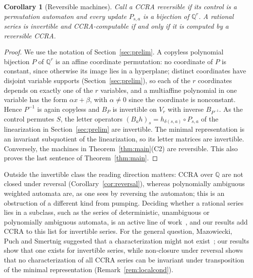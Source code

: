 \documentclass[11pt,letterpaper]{article}
\newcommand{\Q}{\mathbb{Q}}
\newtheorem{corollary}[theorem]{Corollary}
\theoremstyle{definition}
\begin{document}
\begin{corollary}[Reversible machines]\label{cor:reversible}
Call a CCRA \emph{reversible} if its control is a permutation automaton and every update $P_{s,a}$ is a bijection of $\Q^r$. A rational series is invertible and CCRA-computable if and only if it is computed by a reversible CCRA.
\end{corollary}
\begin{proof}
We use the notation of Section~\ref{sec:prelim}. A copyless polynomial bijection $P$ of $\Q^r$ is an affine coordinate permutation: no coordinate of $P$ is constant, since otherwise its image lies in a hyperplane; distinct coordinates have disjoint variable supports (Section~\ref{sec:prelim}), so each of the $r$ coordinates depends on exactly one of the $r$ variables, and a multiaffine polynomial in one variable has the form $\alpha x+\beta$, with $\alpha\ne0$ since the coordinate is nonconstant. Hence $P^{-1}$ is again copyless and $B_P$ is invertible on $V_r$ with inverse $B_{P^{-1}}$. As the control permutes $S$, the letter operators $(B_ah)_s=h_{\delta(s,a)}\circ P_{s,a}$ of the linearization in Section~\ref{sec:prelim} are invertible. The minimal representation is an invariant subquotient of the linearization, so its letter matrices are invertible. Conversely, the machines in Theorem~\ref{thm:main}(C2) are reversible. This also proves the last sentence of Theorem~\ref{thm:main}.
\end{proof}

Outside the invertible class the reading direction matters: CCRA over $\Q$ are not closed under reversal (Corollary~\ref{cor:reversal}), whereas polynomially ambiguous weighted automata are, as one sees by reversing the automaton; this is an obstruction of a different kind from pumping. Deciding whether a rational series lies in a subclass, such as the series of deterministic, unambiguous or polynomially ambiguous automata, is an active line of work~\cite{BS21,BS23,JMP24,PS24}, and our results add CCRA to this list for invertible series. For the general question, Mazowiecki, Puch and Smertnig suggested that a characterization might not exist~\cite{MPS26}; our results show that one exists for invertible series, while non-closure under reversal shows that no characterization of all CCRA series can be invariant under transposition of the minimal representation (Remark~\ref{rem:localcond}).
\end{document}
